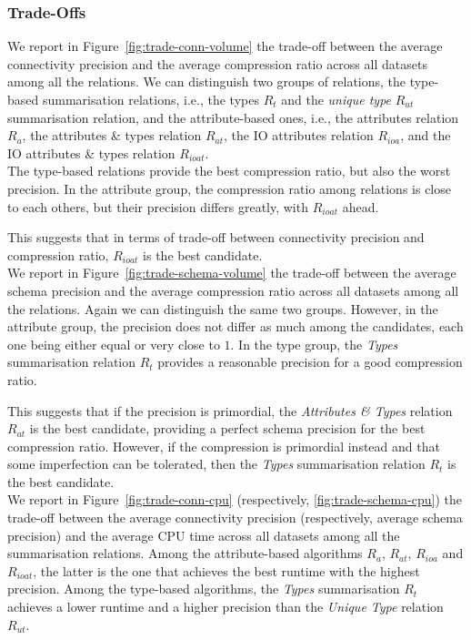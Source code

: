 \subsubsection{Trade-Offs}

We report in Figure~\ref{fig:trade-conn-volume} the trade-off between the average connectivity precision and the average compression ratio across all datasets among all the relations. We can distinguish two groups of relations, the type-based summarisation relations, i.e., the types $R_t$ and the \emph{unique type} $R_{ut}$ summarisation relation, and the attribute-based ones, i.e., the attributes relation $R_a$, the attributes \& types relation $R_{at}$, the IO attributes relation $R_{ioa}$, and the IO attributes \& types relation $R_{ioat}$.\\

The type-based relations provide the best compression ratio, but also the worst precision. In the attribute group, the compression ratio among relations is close to each others, but their precision differs greatly, with $R_{ioat}$ ahead.

This suggests that in terms of trade-off between connectivity precision and compression ratio, $R_{ioat}$ is the best candidate.\\

We report in Figure~\ref{fig:trade-schema-volume} the trade-off between the average schema precision and the average compression ratio across all datasets among all the relations. Again we can distinguish the same two groups. However, in the attribute group, the precision does not differ as much among the candidates, each one being either equal or very close to $1$. In the type group, the \emph{Types} summarisation relation $R_t$ provides a reasonable precision for a good compression ratio.

This suggests that if the precision is primordial, the \emph{Attributes \& Types} relation $R_{at}$ is the best candidate, providing a perfect schema precision for the best compression ratio. However, if the compression is primordial instead and that some imperfection can be tolerated, then the \emph{Types} summarisation relation $R_t$ is the best candidate.\\

We report in Figure~\ref{fig:trade-conn-cpu} (respectively, \ref{fig:trade-schema-cpu}) the trade-off between the average connectivity precision (respectively, average schema precision) and the average CPU time across all datasets among all the summarisation relations. Among the attribute-based algorithms $R_a$, $R_{at}$, $R_{ioa}$ and $R_{ioat}$, the latter is the one that achieves the best runtime with the highest precision. Among the type-based algorithms, the \emph{Types} summarisation $R_t$ achieves a lower runtime and a higher precision than the \emph{Unique Type} relation $R_{ut}$.

